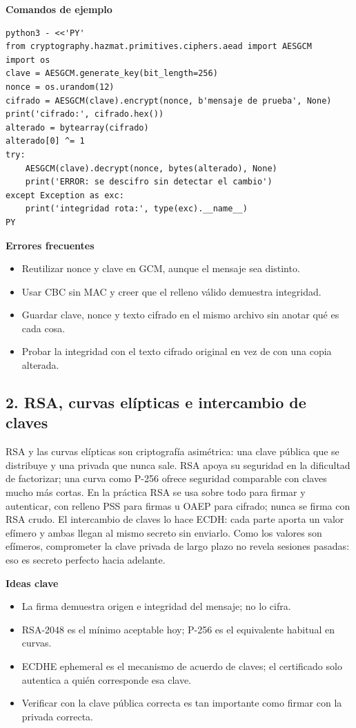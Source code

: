 \documentclass[11pt,a4paper]{article}
\begin{document}
\textbf{Comandos de ejemplo}

\begin{lstlisting}[style=estiloCodigo]
python3 - <<'PY'
from cryptography.hazmat.primitives.ciphers.aead import AESGCM
import os
clave = AESGCM.generate_key(bit_length=256)
nonce = os.urandom(12)
cifrado = AESGCM(clave).encrypt(nonce, b'mensaje de prueba', None)
print('cifrado:', cifrado.hex())
alterado = bytearray(cifrado)
alterado[0] ^= 1
try:
    AESGCM(clave).decrypt(nonce, bytes(alterado), None)
    print('ERROR: se descifro sin detectar el cambio')
except Exception as exc:
    print('integridad rota:', type(exc).__name__)
PY
\end{lstlisting}

\textbf{Errores frecuentes}

\begin{itemize}[leftmargin=1.4em,itemsep=2pt,topsep=3pt]
  \item Reutilizar nonce y clave en GCM, aunque el mensaje sea distinto.
  \item Usar CBC sin MAC y creer que el relleno válido demuestra integridad.
  \item Guardar clave, nonce y texto cifrado en el mismo archivo sin anotar qué es cada cosa.
  \item Probar la integridad con el texto cifrado original en vez de con una copia alterada.
\end{itemize}


\subsection{2. RSA, curvas elípticas e intercambio de claves}

RSA y las curvas elípticas son criptografía asimétrica: una clave pública que se distribuye y una privada que nunca sale. RSA apoya su seguridad en la dificultad de factorizar; una curva como P-256 ofrece seguridad comparable con claves mucho más cortas. En la práctica RSA se usa sobre todo para firmar y autenticar, con relleno PSS para firmas u OAEP para cifrado; nunca se firma con RSA crudo. El intercambio de claves lo hace ECDH: cada parte aporta un valor efímero y ambas llegan al mismo secreto sin enviarlo. Como los valores son efímeros, comprometer la clave privada de largo plazo no revela sesiones pasadas: eso es secreto perfecto hacia adelante.

\textbf{Ideas clave}

\begin{itemize}[leftmargin=1.4em,itemsep=2pt,topsep=3pt]
  \item La firma demuestra origen e integridad del mensaje; no lo cifra.
  \item RSA-2048 es el mínimo aceptable hoy; P-256 es el equivalente habitual en curvas.
  \item ECDHE ephemeral es el mecanismo de acuerdo de claves; el certificado solo autentica a quién corresponde esa clave.
  \item Verificar con la clave pública correcta es tan importante como firmar con la privada correcta.
\end{itemize}
\end{document}
